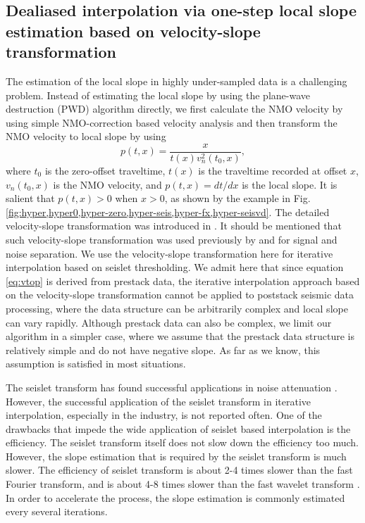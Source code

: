 \subsection{Dealiased interpolation via one-step local slope estimation based on velocity-slope transformation}
The estimation of the local slope in highly under-sampled data is a challenging problem. Instead of estimating the local slope by using the plane-wave destruction (PWD) algorithm \cite{fomel2002pwd} directly, we first calculate the NMO velocity  by using simple NMO-correction based velocity analysis and then transform the NMO velocity to local slope \cite{liuyang2013} by using
\begin{equation}
\label{eq:vtop}
p(t,x)=\frac{x}{t(x)v_n^2(t_0,x)},
\end{equation}
where $t_0$ is the zero-offset traveltime, $t(x)$ is the traveltime recorded at offset $x$, $v_n(t_0,x)$ is the NMO velocity, and $p(t,x)=dt/dx$ is the local slope. It is salient that $p(t,x)>0$ when $x>0$, as shown by the example in Fig. \ref{fig:hyper,hyper0,hyper-zero,hyper-seis,hyper-fx,hyper-seisvd}. The detailed velocity-slope transformation was introduced in \cite{liuyang2013}. It should be mentioned that such velocity-slope transformation was used previously by \cite{liuyang2015} and \cite{shuwei2016} for signal and noise separation. We use the velocity-slope transformation here for iterative interpolation based on seislet thresholding. We admit here that since equation \ref{eq:vtop} is derived from prestack data, the iterative interpolation approach based on the velocity-slope transformation cannot be applied to poststack seismic data processing, where the data structure can be arbitrarily complex and local slope can vary rapidly. Although prestack data can also be complex, we limit our algorithm in a simpler case, where we assume that the prestack data structure is relatively simple and do not have negative slope. As far as we know, this assumption is satisfied in most situations. 

The seislet transform has found successful applications in noise attenuation \cite{seislet,yangkang20142}. However, the successful application of the seislet transform in iterative interpolation, especially in the industry, is not reported often. One of the drawbacks that impede the wide application of seislet based interpolation is the efficiency. The seislet transform itself does not slow down the efficiency too much. However, the slope estimation that is required by the seislet transform is much slower. The efficiency of seislet transform is about 2-4 times slower than the fast Fourier transform, and is about 4-8 times slower than the fast wavelet transform \cite{seislet}.   In order to accelerate the process, the slope estimation is commonly estimated every several iterations.  

